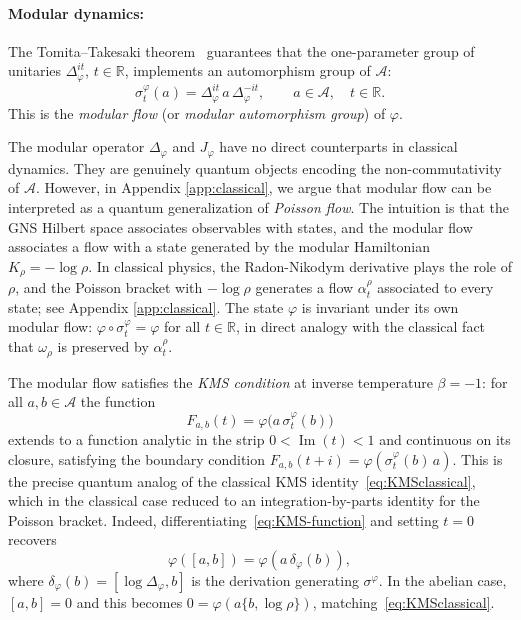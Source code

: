 \documentclass[a4paper,11pt]{article}
\theoremstyle{definition}
\begin{document}
\paragraph{Modular dynamics:}
The Tomita--Takesaki theorem~\cite{Takesaki1970} guarantees that the one-parameter group
of unitaries $\Delta_\varphi^{it}$, $t\in\mathbb{R}$, implements an automorphism group of
$\mathcal{A}$:
\begin{equation}
  \sigma_t^\varphi(a) = \Delta_\varphi^{it}\, a\, \Delta_\varphi^{-it},
  \qquad a\in\mathcal{A},\quad t\in\mathbb{R}.
  \label{eq:modular-flow}
\end{equation}
This is the \emph{modular flow} (or \emph{modular automorphism group}) of $\varphi$. 

The modular operator $\Delta_\varphi$ and $J_\varphi$ have no direct counterparts in classical dynamics. They are genuinely quantum objects encoding the non-commutativity of $\mathcal{A}$. However, in Appendix \ref{app:classical}, we argue that modular flow can be interpreted as a quantum generalization of {\it Poisson flow}. The intuition is that the GNS Hilbert space associates observables with states, and the modular flow associates a flow with a state generated by the modular Hamiltonian $K_\rho=-\log\rho$. In classical physics, the Radon-Nikodym derivative plays the role of $\rho$, and the Poisson bracket with $-\log\rho$ generates a flow $\alpha_t^\rho$ associated to every state; see Appendix \ref{app:classical}. The state $\varphi$ is invariant under its own modular flow:
$\varphi\circ\sigma_t^\varphi = \varphi$ for all $t\in\mathbb{R}$, in direct analogy
with the classical fact that $\omega_\rho$ is preserved by $\alpha_t^\rho$.




The modular flow satisfies the \emph{KMS condition} at inverse temperature $\beta=-1$:
for all $a,b\in\mathcal{A}$ the function
\begin{equation}
  F_{a,b}(t) = \varphi\bigl(a\,\sigma_t^\varphi(b)\bigr)
  \label{eq:KMS-function}
\end{equation}
extends to a function analytic in the strip $0<\operatorname{Im}(t)<1$ and continuous on its
closure, satisfying the boundary condition $F_{a,b}(t+i)=\varphi(\sigma_t^\varphi(b)\,a)$.
This is the precise quantum analog of the classical KMS identity~\eqref{eq:KMSclassical},
which in the classical case reduced to an integration-by-parts identity for the Poisson
bracket.  Indeed, differentiating~\eqref{eq:KMS-function} and setting $t=0$ recovers
\begin{equation}
  \varphi([a,b]) = \varphi(a\,\delta_\varphi(b)),
  \label{eq:KMS-infinitesimal}
\end{equation}
where $\delta_\varphi(b)=[\log\Delta_\varphi,b]$ is the derivation generating $\sigma^\varphi$.
In the abelian case, $[a,b]=0$ and this becomes $0=\varphi(a\{b,\log\rho\})$, matching~\eqref{eq:KMSclassical}.
\end{document}
